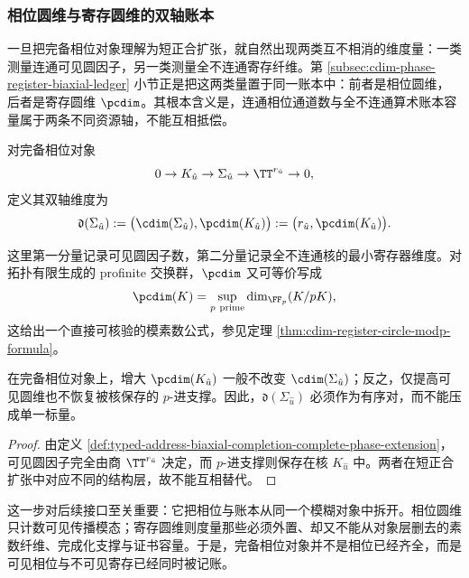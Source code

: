\subsubsection{相位圆维与寄存圆维的双轴账本}\label{subsubsec:typed-address-biaxial-completion-biaxial-ledger}
一旦把完备相位对象理解为短正合扩张，就自然出现两类互不相消的维度量：一类测量连通可见圆因子，另一类测量全不连通寄存纤维。第 \ref{subsec:cdim-phase-register-biaxial-ledger} 小节正是把这两类量置于同一账本中：前者是相位圆维，后者是寄存圆维 \(\pcdim\)。其根本含义是，连通相位通道数与全不连通算术账本容量属于两条不同资源轴，不能互相抵偿。

\begin{definition}[完备相位对象的双轴维度]\label{def:typed-address-biaxial-completion-biaxial-dimension}
对完备相位对象
\[
0\to K_{\hat u}\to \Sigma_{\hat u}\to \TT^{r_{\hat u}}\to 0,
\]
定义其双轴维度为
\[
\mathfrak d(\Sigma_{\hat u})
:=
\bigl(\cdim(\Sigma_{\hat u}),\pcdim(K_{\hat u})\bigr)
:=
\bigl(r_{\hat u},\pcdim(K_{\hat u})\bigr).
\]
\end{definition}

这里第一分量记录可见圆因子数，第二分量记录全不连通核的最小寄存器维度。对拓扑有限生成的 profinite 交换群，\(\pcdim\) 又可等价写成
\[
\pcdim(K)=\sup_{p\ \mathrm{prime}}\dim_{\FF_p}(K/pK),
\]
这给出一个直接可核验的模素数公式，参见定理 \ref{thm:cdim-register-circle-modp-formula}。

\begin{proposition}[双轴不可互代]\label{prop:typed-address-biaxial-completion-biaxial-nonsubstitutable}
在完备相位对象上，增大 \(\pcdim(K_{\hat u})\) 一般不改变 \(\cdim(\Sigma_{\hat u})\)；反之，仅提高可见圆维也不恢复被核保存的 \(p\)-进支撑。因此，\(\mathfrak d(\Sigma_{\hat u})\) 必须作为有序对，而不能压成单一标量。
\end{proposition}
\begin{proof}
由定义 \ref{def:typed-address-biaxial-completion-complete-phase-extension}，可见圆因子完全由商 \(\TT^{r_{\hat u}}\) 决定，而 \(p\)-进支撑则保存在核 \(K_{\hat u}\) 中。两者在短正合扩张中对应不同的结构层，故不能互相替代。
\end{proof}

这一步对后续接口至关重要：它把相位与账本从同一个模糊对象中拆开。相位圆维只计数可见传播模态；寄存圆维则度量那些必须外置、却又不能从对象层删去的素数纤维、完成化支撑与证书容量。于是，完备相位对象并不是相位已经齐全，而是可见相位与不可见寄存已经同时被记账。


